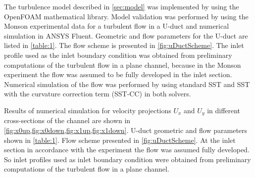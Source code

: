 \documentclass[a4paper]{jpconf}
\begin{document}
The turbulence model described in \cref{sec:model} was implemented by using the OpenFOAM{\textregistered} mathematical library. Model validation was performed by using the Monson \cite{Monson} experimental data for a turbulent flow in a U-duct and numerical simulation in ANSYS Fluent{\textregistered}. Geometric and flow parameters for the U-duct are listed in \cref{table:1}. The flow scheme is presented in \cref{fig:uDuctScheme}.
The inlet profile used as the inlet boundary condition was obtained from preliminary 
computations of the turbulent flow in a plane channel, because in the Monson experiment \cite{Monson} the 
flow was assumed to be fully developed in the inlet section. Numerical simulation of the flow 
was performed by using standard SST and SST with the curvature correction term (SST-CC) in 
both solvers.

Results of numerical simulation for velocity projections $U_x$ and $U_y$ in different cross-sections of the channel are shown in \cref{fig:x0up,fig:x0down,fig:x1up,fig:x1down}. 
U-duct geometric and flow parameters shown in \cref{table:1}. Flow scheme presented in \cref{fig:uDuctScheme}. At the inlet section in accordance with the experiment the flow was assumed fully developed. So inlet profiles used as inlet boundary condition were obtained from preliminary computations of the turbulent flow in a plane channel.
\end{document}
